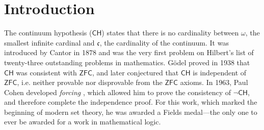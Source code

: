 \documentclass[sigplan,10pt,review, autoref,anonymous]{acmart}
\theoremstyle{definition}
\begin{document}



\maketitle


\section{Introduction}
\label{section:intro}
The continuum hypothesis ($\mathsf{CH}$) states that there is no cardinality between $\omega$, the smallest infinite cardinal and $\mathfrak{c}$, the cardinality of the continuum.
It was introduced by Cantor \cite{cantor1878beitrag} in 1878 and was the very first problem on Hilbert's list of twenty-three outstanding problems in mathematics.
G\"odel \cite{godel1938consistency} proved in 1938 that $\mathsf{CH}$ was consistent with $\mathsf{ZFC}$, and later conjectured that $\mathsf{CH}$ is independent of $\mathsf{ZFC}$, i.e. neither provable nor disprovable from the $\mathsf{ZFC}$ axioms.
In 1963, Paul Cohen developed \emph{forcing} \cite{cohen-the-independence-of-the-continuum-hypothesis-1,cohen1964independence2}, which allowed him to prove the consistency of $\neg \mathsf{CH}$, and therefore complete the independence proof.
For this work, which marked the beginning of modern set theory, he was awarded a Fields medal---the only one to ever be awarded for a work in mathematical logic.
\end{document}
